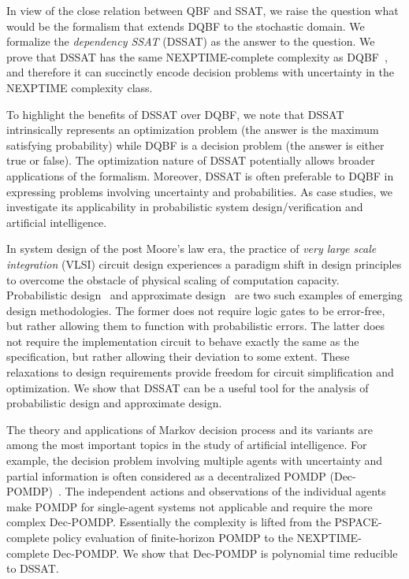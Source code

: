 In view of the close relation between QBF and SSAT, we raise the question what would be the formalism that extends DQBF to the stochastic domain.
We formalize the \emph{dependency SSAT} (DSSAT) as the answer to the question.
We prove that DSSAT has the same NEXPTIME-complete complexity as DQBF~\cite{Peterson2001}, and therefore it can succinctly encode decision problems with uncertainty in the NEXPTIME complexity class.

To highlight the benefits of DSSAT over DQBF, we note that DSSAT intrinsically represents an optimization problem (the answer is the maximum satisfying probability) while DQBF is a decision problem (the answer is either true or false).
The optimization nature of DSSAT potentially allows broader applications of the formalism.
Moreover, DSSAT is often preferable to DQBF in expressing problems involving uncertainty and probabilities.
As case studies, we investigate its applicability in probabilistic system design/verification and artificial intelligence.

In system design of the post Moore's law era, the practice of \textit{very large scale integration} (VLSI) circuit design experiences a paradigm shift in design principles to overcome the obstacle of physical scaling of computation capacity.
Probabilistic design~\cite{Chakrapani2006ProbDesign} and approximate design~\cite{Venkatesan2011ApproxDesign} are two such examples of emerging design methodologies.
The former does not require logic gates to be error-free, but rather allowing them to function with probabilistic errors.
The latter does not require the implementation circuit to behave exactly the same as the specification, but rather allowing their deviation to some extent.
These relaxations to design requirements provide freedom for circuit simplification and optimization.
We show that DSSAT can be a useful tool for the analysis of probabilistic design and approximate design.

The theory and applications of Markov decision process and its variants are among the most important topics in the study of artificial intelligence.
For example, the decision problem involving multiple agents with uncertainty and partial information is often considered as a decentralized POMDP (Dec-POMDP)~\cite{Oliehoek2016}.
The independent actions and observations of the individual agents make POMDP for single-agent systems not applicable and require the more complex Dec-POMDP.
Essentially the complexity is lifted from the PSPACE-complete policy evaluation of finite-horizon POMDP to the NEXPTIME-complete Dec-POMDP.
We show that Dec-POMDP is polynomial time reducible to DSSAT.


